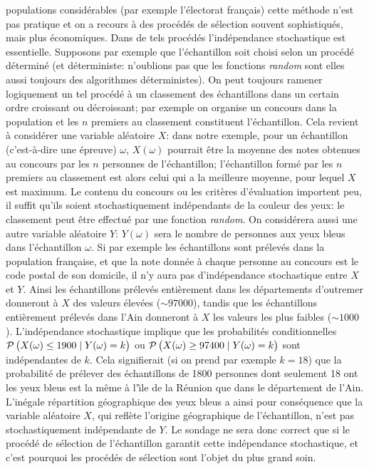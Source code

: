 populations consid\'erables (par exemple l'\'electorat fran\c{c}ais) cette 
m\'ethode n'est pas pratique et on a recours \`a des proc\'ed\'es de 
s\'election souvent sophistiqu\'es,  mais plus \'economiques. 
\medskip
Dans de tels proc\'ed\'es l'ind\'ependance stochastique est essentielle. 
Supposons par exemple que l'\'echantillon soit choisi selon un proc\'ed\'e 
d\'etermin\'e (et d\'eterministe: n'oublions pas que les fonctions {\it
random} sont elles aussi toujours des algorithmes d\'eterministes). On 
peut toujours ramener logiquement un tel proc\'ed\'e \`a un classement
des \'echantillons dans un certain ordre croissant ou d\'ecroissant; par 
exemple on organise un concours dans la population et les $n$ premiers
au classement constituent l'\'echantillon. Cela revient \`a consid\'erer 
une variable al\'eatoire $X$: dans notre exemple, pour un \'echantillon 
(c'est-\`a-dire une \'epreuve) $\omega$, $X(\omega )$ pourrait \^etre la 
moyenne des notes obtenues au concours par les $n$ personnes de 
l'\'echantillon; l'\'echantillon form\'e par les $n$ premiers au
classement est alors celui qui a la meilleure moyenne, pour lequel $X$ 
est maximum.  Le contenu du concours ou les crit\`eres d'\'evaluation
importent peu,  il suffit qu'ils soient stochastiquement ind\'ependants
de la couleur des yeux:  le classement peut \^etre effectu\'e par une
fonction {\it random}.  On consid\'erera aussi une autre variable
al\'eatoire $Y$:  $Y(\omega )$ sera le nombre de personnes aux yeux
bleus dans l'\'echantillon $\omega$. 
\medskip 
Si par exemple les \'echantillons sont pr\'elev\'es dans la population
fran\c{c}aise, et que la note donn\'ee \`a chaque personne au concours
est le code postal de son domicile, il n'y aura pas d'ind\'ependance 
stochastique entre $X$ et $Y$. Ainsi les \'echantillons pr\'elev\'es 
enti\`erement dans les d\'epartements d'outremer donneront \`a $X$
des valeurs \'elev\'ees ($\sim 97000$), tandis que les \'echantillons 
enti\`erement pr\'elev\'es dans l'Ain donneront \`a $X$ les valeurs les 
plus faibles ($\sim 1000$). L'ind\'ependance stochastique implique que 
les probabilit\'es conditionnelles ${\cal P}\, \bigl( X(\omega ) \leq 1900 
\mid Y(\omega ) = k\bigr)$ ou ${\cal P}\, \bigl( X(\omega ) \geq 97400 
\mid Y(\omega ) = k\bigr)$ sont ind\'ependantes de $k$. Cela 
signifierait (si on prend par exemple $k=18$) que la probabilit\'e de 
pr\'elever des \'echantillons de 1800 personnes dont seulement 18 ont 
les yeux bleus est la m\^eme \`a l'{\^\i}le de la R\'eunion que dans le 
d\'epartement de l'Ain. L'in\'egale r\'epartition g\'eographique des yeux 
bleus a ainsi pour cons\'equence que la variable al\'eatoire $X$, qui 
refl\`ete l'origine g\'eographique de l'\'echantillon, n'est pas 
stochastiquement ind\'ependante de $Y$. Le sondage ne sera donc correct 
que si le proc\'ed\'e de s\'election de l'\'echantillon garantit cette 
ind\'ependance stochastique, et c'est pourquoi les proc\'ed\'es de 
s\'election sont l'objet du plus grand soin. 
 
